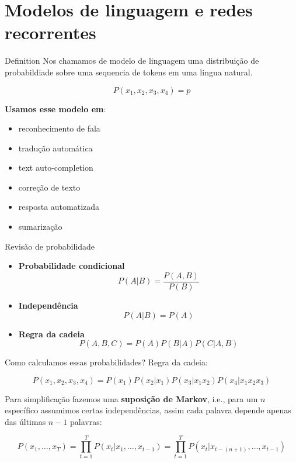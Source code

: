 \documentclass[10pt]{beamer}
\begin{document}
\section{Modelos de linguagem e redes recorrentes}


\begin{frame}{Definition}
Nos chamamos de \alert{modelo de linguagem} uma distribuição de probabildiade sobre uma sequencia de tokens em uma lingua natural.

\[
P(x_1,x_2,x_3,x_4) = p
\]

\textbf{Usamos esse modelo em}:
\begin{itemize}
\item reconhecimento de fala
\item tradução automática
\item text auto-completion
\item correção de texto
\item resposta automatizada
\item sumarização
\end{itemize}


\end{frame}

\begin{frame}{Revisão de probabilidade}
\large{
\begin{itemize}
\item \textbf{Probabilidade condicional} 
\[
P(A|B) = \frac{P(A,B)}{P(B)}
\]
\item \textbf{Independência} 
\[
P(A|B) = P(A)
\]
\item \textbf{Regra da cadeia} 
\[
P(A,B,C) = P(A)P(B|A)P(C|A,B)
\]
\end{itemize}
}
\end{frame}


\begin{frame}{Como calculamos essas probabilidades?}
Regra da cadeia:

\begin{equation*}
P(x_1,x_2,x_3,x_4) = P(x_1)P(x_2\vert x_1)P(x_3\vert x_1x_2)P(x_4\vert x_1x_2x_3)
\end{equation*}

\vspace{0.3cm}

Para simplificação fazemos uma \textbf{suposição de Markov}, i.e., para um  $n$ específico assumimos certas independências, assim cada palavra depende apenas das últimas $n-1$ palavras:



\begin{equation*}
P(x_1, \dots, x_T) = \prod_{t=1}^{T} P(x_t \vert x_1, \dots, x_{t-1}) = \prod_{t=1}^{T} P(x_{t} \vert x_{t - (n+1)}, \dots, x_{t-1})
\end{equation*} 

\end{frame}
\end{document}
